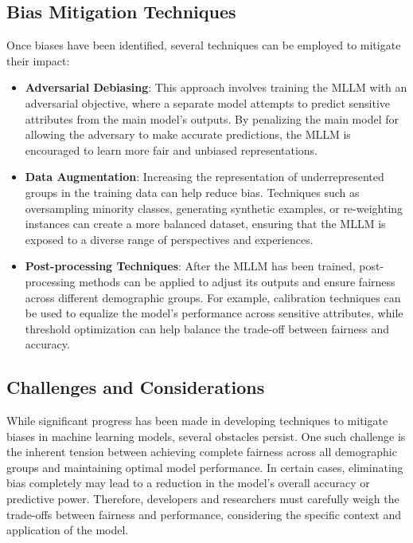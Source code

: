 \subsection{Bias Mitigation Techniques}

Once biases have been identified, several techniques can be employed to mitigate their impact\cite{tripathi2024insaaf, lee2024life}:

\begin{itemize}
    \item \textbf{Adversarial Debiasing}: This approach involves training the MLLM with an adversarial objective, where a separate model attempts to predict sensitive attributes from the main model's outputs. By penalizing the main model for allowing the adversary to make accurate predictions, the MLLM is encouraged to learn more fair and unbiased representations.
    
    \item \textbf{Data Augmentation}: Increasing the representation of underrepresented groups in the training data can help reduce bias. Techniques such as oversampling minority classes, generating synthetic examples, or re-weighting instances can create a more balanced dataset, ensuring that the MLLM is exposed to a diverse range of perspectives and experiences.
    
    \item \textbf{Post-processing Techniques}: After the MLLM has been trained, post-processing methods can be applied to adjust its outputs and ensure fairness across different demographic groups. For example, calibration techniques can be used to equalize the model's performance across sensitive attributes, while threshold optimization can help balance the trade-off between fairness and accuracy.
\end{itemize}

\subsection{Challenges and Considerations}

While significant progress has been made in developing techniques to mitigate biases in machine learning models, several obstacles persist. One such challenge is the inherent tension between achieving complete fairness across all demographic groups and maintaining optimal model performance. In certain cases, eliminating bias completely may lead to a reduction in the model's overall accuracy or predictive power. Therefore, developers and researchers must carefully weigh the trade-offs between fairness and performance, considering the specific context and application of the model.

